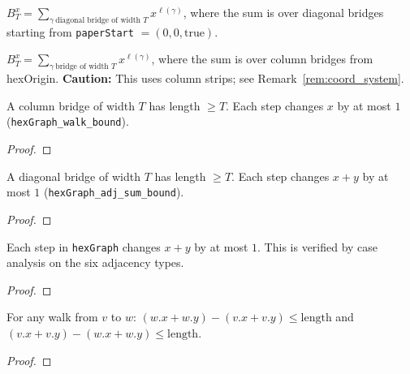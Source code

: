 \begin{definition}\label{def:diag_bridge_partition}
\leanok
{}
  $B_T^x = \sum_{\gamma\ \text{diagonal bridge of width } T} x^{\ell(\gamma)}$,
  where the sum is over diagonal bridges starting from \texttt{paperStart} $= (0,0,\mathrm{true})$.
\end{definition}

\begin{definition}\label{def:bridge_partition}
\leanok
{}
  $B_T^x = \sum_{\gamma\ \text{bridge of width } T} x^{\ell(\gamma)}$,
  where the sum is over column bridges from hexOrigin.
  \textbf{Caution:} This uses column strips; see Remark~\ref{rem:coord_system}.
\end{definition}

\begin{theorem}\label{thm:bridge_length_ge_width}
\leanok
{}
  A column bridge of width $T$ has length $\geq T$.
  Each step changes $x$ by at most $1$ (\texttt{hexGraph\_walk\_bound}).
\end{theorem}
\begin{proof}
\leanok
\end{proof}

\begin{theorem}\label{thm:diag_bridge_length}
\leanok
{}
  A diagonal bridge of width $T$ has length $\geq T$.
  Each step changes $x+y$ by at most $1$ (\texttt{hexGraph\_adj\_sum\_bound}).
\end{theorem}
\begin{proof}
\leanok
\end{proof}

\begin{lemma}\label{lem:hex_sum_bound}
\leanok
{}
  Each step in \texttt{hexGraph} changes $x + y$ by at most $1$.
  This is verified by case analysis on the six adjacency types.
\end{lemma}
\begin{proof}
\leanok
\end{proof}

\begin{lemma}\label{lem:walk_sum_bound}
\leanok
{}
  For any walk from $v$ to $w$:
  $(w.x + w.y) - (v.x + v.y) \leq \text{length}$ and
  $(v.x + v.y) - (w.x + w.y) \leq \text{length}$.
\end{lemma}
\begin{proof}
\leanok
\end{proof}

